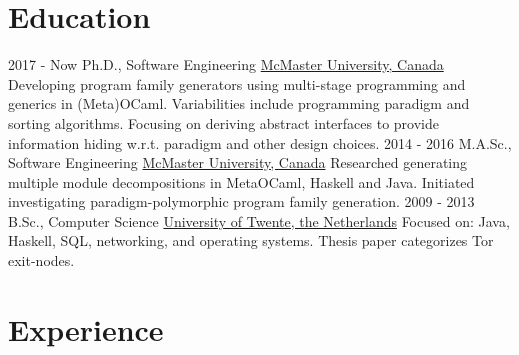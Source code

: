 \documentclass[letterpaper]{twentysecondcv} %
\begin{document}
\makeprofile %



\section{Education}

\begin{twenty} %
  \twentyitem
    {2017 - Now}
    {}
    {Ph.D., Software Engineering}
    {\href{https://www.mcmaster.ca/}{McMaster University, Canada}}
    {
      Developing program family generators using multi-stage programming and generics in (Meta)OCaml.
      Variabilities include programming paradigm and sorting algorithms. Focusing on deriving abstract interfaces to provide information hiding w.r.t. paradigm and other design choices.
    }
    {}
  \twentyitem
    {2014 - 2016}
    {}
    {M.A.Sc., Software Engineering}
    {\href{https://www.mcmaster.ca/}{McMaster University, Canada}}
    {
      Researched generating multiple module decompositions in MetaOCaml, Haskell and Java.
      Initiated investigating paradigm-polymorphic program family generation.
    }
    {}
  \twentyitem
    {2009 - 2013}
    {}
    {B.Sc., Computer Science}%
    {\href{https://www.utwente.nl/}{University of Twente, the Netherlands}}
    {Focused on: Java, Haskell, SQL, networking, and operating systems. Thesis paper categorizes Tor exit-nodes.}
    {}
\end{twenty}
\vspace{-.5em}


\section{Experience}
\end{document}
